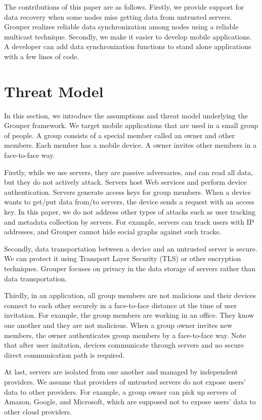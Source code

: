 The contributions of this paper are as follows.
Firstly, we provide support for data recovery when some nodes miss getting data from untrusted servers.
Grouper realizes reliable data synchronization among nodes using a reliable multicast technique.
Secondly, we make it easier to develop mobile applications.
A developer can add data synchronization functions to stand alone applications with a few lines of code.

\section{Threat Model}

In this section, we introduce the assumptions and threat model underlying the Grouper framework.
We target mobile applications that are used in a small group of people.
A group consists of a special member called an owner and other members.
Each member has a mobile device.
A owner invites other members in a face-to-face way.

Firstly, while we use servers, they are passive adversaries, and can read all data, but they do not actively attack.
Servers host Web services and perform device authentication.
Servers generate access keys for group members. 
When a device wants to get/put data from/to servers, the device sends a request with an access key.
In this paper, we do not address other types of attacks such as user tracking and metadata collection by servers. 
For example, servers can track users with IP addresses, and Grouper cannot hide social graphs against such tracks.

Secondly, data transportation between a device and an untrusted server is secure.
We can protect it using Transport Layer Security (TLS) or other encryption techniques.
Grouper focuses on privacy in the data storage of servers rather than data transportation.

Thirdly, in an application, all group members are not malicious and their devices connect to each other securely in a face-to-face distance at the time of user invitation.
For example, the group members are working in an office.
They know one another and they are not malicious.
When a group owner invites new members, the owner authenticates group members by a face-to-face way.
Note that after user imitation, devices communicate through servers and no secure direct communication path is required.

At last, servers are isolated from one another and managed by independent providers.
We assume that providers of untrusted servers do not expose users' data to other providers.
For example, a group owner can pick up servers of Amazon, Google, and Microsoft, which are supposed not to expose users' data to other cloud providers.

